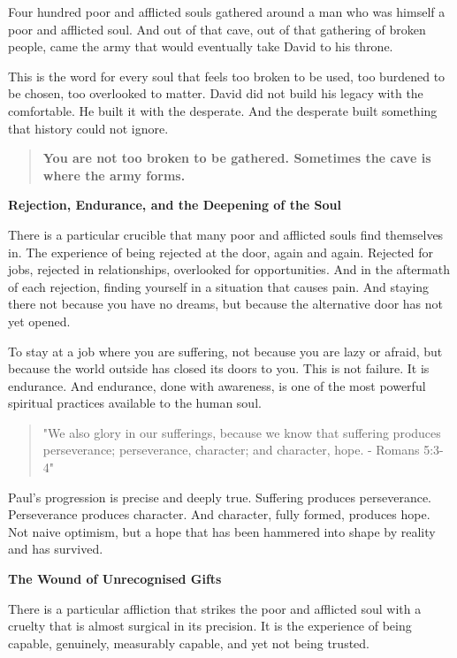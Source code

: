 Four hundred poor and afflicted souls gathered around a man who was
himself a poor and afflicted soul. And out of that cave, out of that
gathering of broken people, came the army that would eventually take
David to his throne.

This is the word for every soul that feels too broken to be used, too
burdened to be chosen, too overlooked to matter. David did not build his
legacy with the comfortable. He built it with the desperate. And the
desperate built something that history could not ignore.

\begin{quote}
\textbf{You are not too broken to be gathered. Sometimes the cave is
where the army forms.}
\end{quote}

\textbf{Rejection, Endurance, and the Deepening of the Soul}

There is a particular crucible that many poor and afflicted souls find
themselves in. The experience of being rejected at the door, again and
again. Rejected for jobs, rejected in relationships, overlooked for
opportunities. And in the aftermath of each rejection, finding yourself
in a situation that causes pain. And staying there not because you have
no dreams, but because the alternative door has not yet opened.

To stay at a job where you are suffering, not because you are lazy or
afraid, but because the world outside has closed its doors to you. This
is not failure. It is endurance. And endurance, done with awareness, is
one of the most powerful spiritual practices available to the human
soul.

\begin{quote}
"We also glory in our sufferings, because we know that suffering
produces perseverance; perseverance, character; and character, hope. -
Romans 5:3-4"
\end{quote}

Paul's progression is precise and deeply true. Suffering produces
perseverance. Perseverance produces character. And character, fully
formed, produces hope. Not naive optimism, but a hope that has been
hammered into shape by reality and has survived.

\textbf{The Wound of Unrecognised Gifts}

There is a particular affliction that strikes the poor and afflicted
soul with a cruelty that is almost surgical in its precision. It is the
experience of being capable, genuinely, measurably capable, and yet not
being trusted.

